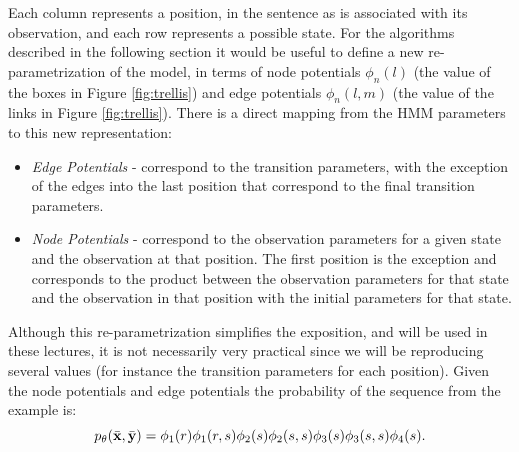 Each column represents a position, in the sentence as is associated
with its observation, and each row represents a possible state. 
For the algorithms described in the following section it would be
useful to define a new re-parametrization of the model, in terms of
node potentials $\phi_n(l)$ (the value of the boxes in Figure \ref{fig:trellis})
and edge potentials $\phi_n(l,m)$ (the value of the links in  Figure
\ref{fig:trellis}). There is a direct mapping from the HMM
parameters to this new representation: 
\begin{itemize}
\item\emph{Edge Potentials} - correspond to the transition parameters, with the exception of the
edges into the last position that correspond to the final transition parameters.
\item\emph{Node Potentials} - correspond to the observation
parameters for a given state and the observation at that position.  The
first position is the exception and corresponds to the
product between the observation parameters for that state and
the observation in that position with the initial parameters for that state. 
\end{itemize}

Although this re-parametrization simplifies the exposition, and will be
used in these lectures, it is not necessarily very practical since we
will be reproducing several values (for instance the transition
parameters for each position).
Given the node potentials and edge potentials the probability of the
sequence from the example is:
\begin{equation}
  p_{\theta}(\bar{\mathbf{x}} ,\bar{\mathbf{y}}) =\phi_1(r)\phi_1(r,s)\phi_2(s)\phi_2(s,s)\phi_3(s)\phi_3(s,s)\phi_4(s).
  \label{eqn:hmm_ex_treelis}
\end{equation}

